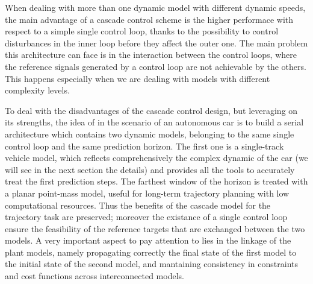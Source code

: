 \documentclass[a4paper, onecolumn, 12pt]{article}
\begin{document}
When dealing with more than one dynamic model with different dynamic speeds,
the main advantage of a cascade control scheme is the higher performace with respect
to a simple single control loop, thanks to the possibility to control disturbances
in the inner loop before they affect the outer one. The main problem this architecture
can face is in the interaction between the control loops, where the reference signals 
generated by a control loop are not achievable by the others. This happens especially
when we are dealing with models with different complexity levels.

To deal with the disadvantages of the cascade control design, but leveraging on
its strengths, the idea of \cite{paper} in the scenario of an autonomous car is
to build a serial architecture which contains two dynamic models, belonging to
the same single control loop and the same prediction horizon. The first one is a
single-track vehicle model, which reflects comprehensively the complex dynamic
of the car (we will see in the next section the details) and provides all the
tools to accurately treat the first prediction steps. The farthest window of the
horizon is treated with a planar point-mass model, useful for long-term
trajectory planning with low computational resources. Thus the benefits of the
cascade model for the trajectory task are preserved; moreover the existance of a
single control loop ensure the feasibility of the reference targets that are
exchanged between the two models. A very important aspect to pay attention to
lies in the linkage of the plant models, namely propagating correctly the final
state of the first model to the initial state of the second model, and
mantaining consistency in constraints and cost functions across interconnected
models. 
\end{document}
